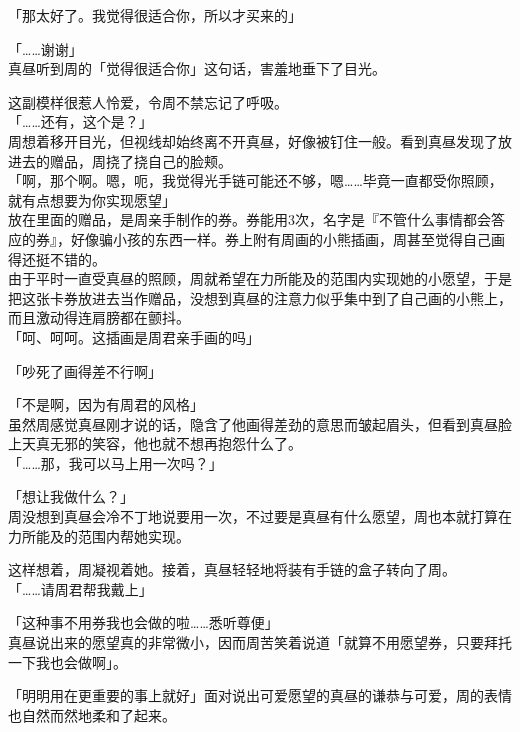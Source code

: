 「那太好了。我觉得很适合你，所以才买来的」

「……谢谢」\\

真昼听到周的「觉得很适合你」这句话，害羞地垂下了目光。

这副模样很惹人怜爱，令周不禁忘记了呼吸。\\

「……还有，这个是？」\\

周想着移开目光，但视线却始终离不开真昼，好像被钉住一般。看到真昼发现了放进去的赠品，周挠了挠自己的脸颊。\\

「啊，那个啊。嗯，呃，我觉得光手链可能还不够，嗯……毕竟一直都受你照顾，就有点想要为你实现愿望」\\

放在里面的赠品，是周亲手制作的券。券能用3次，名字是『不管什么事情都会答应的券』，好像骗小孩的东西一样。券上附有周画的小熊插画，周甚至觉得自己画得还挺不错的。\\

由于平时一直受真昼的照顾，周就希望在力所能及的范围内实现她的小愿望，于是把这张卡券放进去当作赠品，没想到真昼的注意力似乎集中到了自己画的小熊上，而且激动得连肩膀都在颤抖。
\\

「呵、呵呵。这插画是周君亲手画的吗」

「吵死了画得差不行啊」

「不是啊，因为有周君的风格」\\

虽然周感觉真昼刚才说的话，隐含了他画得差劲的意思而皱起眉头，但看到真昼脸上天真无邪的笑容，他也就不想再抱怨什么了。\\

「……那，我可以马上用一次吗？」

「想让我做什么？」\\

周没想到真昼会冷不丁地说要用一次，不过要是真昼有什么愿望，周也本就打算在力所能及的范围内帮她实现。

这样想着，周凝视着她。接着，真昼轻轻地将装有手链的盒子转向了周。\\

「……请周君帮我戴上」

「这种事不用券我也会做的啦……悉听尊便」\\

真昼说出来的愿望真的非常微小，因而周苦笑着说道「就算不用愿望券，只要拜托一下我也会做啊」。

「明明用在更重要的事上就好」面对说出可爱愿望的真昼的谦恭与可爱，周的表情也自然而然地柔和了起来。\\


